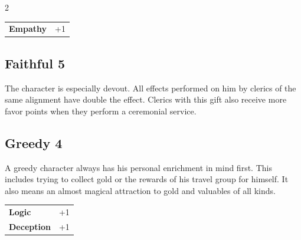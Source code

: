 \begin{multicols}{2}
\begin{tcolorbox}
\vspace{3mm}

\begin{tabular}{@{}ll@{}}
    \textbf{Empathy} & +1\\
\end{tabular}


\end{tcolorbox}

\begin{tcolorbox}
    \subsection*{Faithful \hfill \small{5 }}
    \tcblower
The character is especially devout. All effects performed on him by clerics of the same alignment have double the effect. Clerics with this gift also receive more favor points when they perform a ceremonial service.


\vspace{3mm}



\end{tcolorbox}

\begin{tcolorbox}
    \subsection*{Greedy \hfill \small{4 }}
    \tcblower
A greedy character always has his personal enrichment in mind first. This includes trying to collect gold or the rewards of his travel group for himself. It also means an almost magical attraction to gold and valuables of all kinds.


\vspace{3mm}

\begin{tabular}{@{}ll@{}}
    \textbf{Logic} & +1\\
    \textbf{Deception} & +1\\
\end{tabular}



\end{tcolorbox}
\end{multicols}
